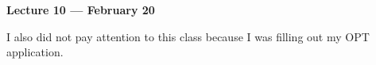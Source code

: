 
\vspace{3mm}
\noindent \textbf{Lecture 10 --- February 20\th}

I also did not pay attention to this class because I was filling out my OPT application.